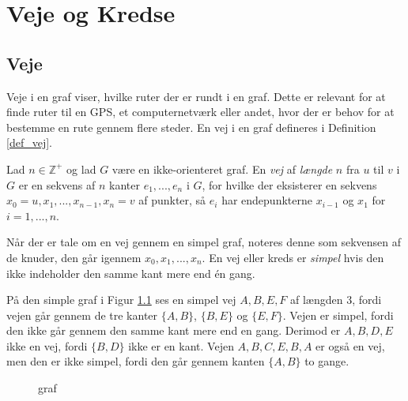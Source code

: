\chapter{Veje og Kredse}



\section{Veje}
Veje i en graf viser, hvilke ruter der er rundt i en graf. Dette er relevant for at finde ruter til en GPS, et computernetværk eller andet, hvor der er behov for at bestemme en rute gennem flere steder. 
En vej i en graf defineres i Definition \ref{def_vej}.

\begin{defn}
\label{def_vej}
Lad $n \in  \mathbb{Z}^{+}$ og lad $G$ være en ikke-orienteret graf. 
En \textit{vej} af \textit{længde} $n$ fra $u$ til $v$ i $G$ er en sekvens af $n$ kanter $e_1, ..., e_n$ i $G$, for hvilke der eksisterer en sekvens $x_0=u,x_1,...,x_{n-1},x_n=v$ af punkter, så $e_i$ har endepunkterne $x_{i-1}$ og $x_1$ for $i=1,...,n$.
\end{defn}

\noindent Når der er tale om en vej gennem en simpel graf, noteres denne som sekvensen af de knuder, den går igennem $x_0, x_1,...,x_n$. 
En vej eller kreds er \textit{simpel} hvis den ikke indeholder den samme kant mere end én gang. 

\begin{exmp}
\label{ex_vej}
På den simple graf i Figur \ref{graf_vej} ses en simpel vej $A,B,E,F$ af længden 3, fordi vejen går gennem de tre kanter $\lbrace A,B \rbrace$, $\lbrace B,E \rbrace$ og $\lbrace E,F \rbrace$. 
Vejen er simpel, fordi den ikke går gennem den samme kant mere end en gang. 
Derimod er $A,B,D,E$ ikke en vej, fordi $\lbrace B,D \rbrace$ ikke er en kant. 
Vejen $A,B,C,E,B,A$ er også en vej, men den er ikke simpel, fordi den går gennem kanten $\lbrace A,B \rbrace$ to gange. 
\end{exmp}

\begin{figure}[h]
\centering
{}
\caption{graf} 
\label{graf_vej}
\end{figure}

